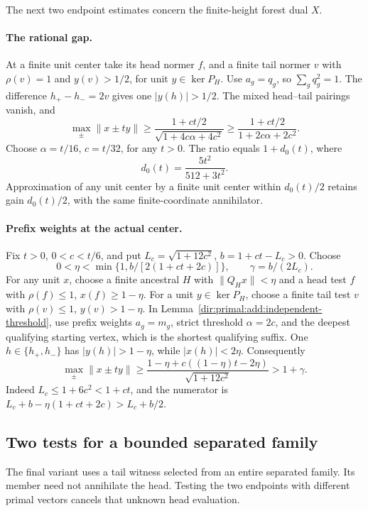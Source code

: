 The next two endpoint estimates concern the finite-height forest dual $X$.

\paragraph{The rational gap.}\label{dir:primal:add:rational}
At a finite unit center take its head normer \(f\), and a finite tail
normer \(v\) with \(\rho(v)=1\) and \(y(v)>1/2\), for unit
\(y\in\ker P_H\). Use \(a_g=q_g\), so \(\sum_gq_g^2=1\).
The difference \(h_+-h_-=2v\) gives one \(|y(h)|>1/2\).
The mixed head--tail pairings vanish, and
\[
 \max_{\pm}\|x\pm ty\|
 \ge\frac{1+ct/2}{\sqrt{1+4c\alpha+4c^2}}
 \ge\frac{1+ct/2}{1+2c\alpha+2c^2}.
\]
Choose \(\alpha=t/16\), \(c=t/32\), for any \(t>0\). The ratio equals
\(1+d_0(t)\), where
\[
 d_0(t)=\frac{5t^2}{512+3t^2}.
\]
Approximation of any unit center by a finite unit center within
\(d_0(t)/2\) retains gain \(d_0(t)/2\), with the same finite-coordinate
annihilator.

\paragraph{Prefix weights at the actual center.}
\label{dir:primal:add:root-actual}
Fix \(t>0\), \(0<c<t/6\), and put
\(L_c=\sqrt{1+12c^2}\), \(b=1+ct-L_c>0\).
Choose
\[
 0<\eta<\min\{1,b/[2(1+ct+2c)]\},\qquad
 \gamma=b/(2L_c).
\]
For any unit \(x\), choose a finite ancestral \(H\) with
\(\|Q_Hx\|<\eta\) and a head test \(f\) with
\(\rho(f)\le1\), \(x(f)\ge1-\eta\).
For a unit \(y\in\ker P_H\), choose a finite tail test \(v\) with
\(\rho(v)\le1\), \(y(v)>1-\eta\). In
Lemma~\ref{dir:primal:add:independent-threshold}, use prefix weights
\(a_g=m_g\), strict threshold \(\alpha=2c\), and the deepest qualifying
starting vertex, which is the shortest qualifying suffix.
One \(h\in\{h_+,h_-\}\) has \(|y(h)|>1-\eta\), while
\(|x(h)|<2\eta\). Consequently
\begin{equation}\label{dir:primal:add:root-actual-gain}
 \max_{\pm}\|x\pm ty\|
 \ge\frac{1-\eta+c((1-\eta)t-2\eta)}{\sqrt{1+12c^2}}
 >1+\gamma.
\end{equation}
Indeed \(L_c\le1+6c^2<1+ct\), and the numerator is
\(L_c+b-\eta(1+ct+2c)>L_c+b/2\).

\subsection{Two tests for a bounded separated family}
\label{dir:primal:add:fixed-bound}
The final variant uses a tail witness selected from an entire separated
family. Its member need not annihilate the head. Testing the two endpoints
with different primal vectors cancels that unknown head evaluation.

